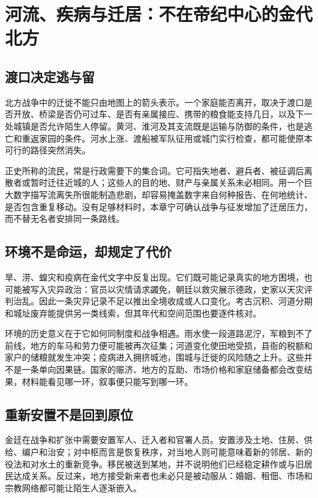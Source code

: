 \section{河流、疾病与迁居：不在帝纪中心的金代北方}

\subsection{渡口决定逃与留}

北方战争中的迁徙不能只由地图上的箭头表示。一个家庭能否离开，取决于渡口是否开放、桥梁是否仍可过车、是否有亲属接应、携带的粮食能支持几日，以及下一处城镇是否允许陌生人停留。黄河、淮河及其支流既是运输与防御的条件，也是逃亡和重返家园的条件。河水上涨、渡船被军队征用或城门实行检查，都可能使原本可行的路径突然消失。

正史所称的流民，常是行政需要下的集合词。它可指失地者、避兵者、被征调后离散者或暂时迁往近城的人；这些人的目的地、财产与亲属关系未必相同。用一个巨大数字描写流离失所很能制造悲剧，却容易掩盖数字来自何种报告、在何地统计、是否包含重复移动。没有足够材料时，本章宁可确认战争与征发增加了迁居压力，而不替无名者安排同一条路线。

\subsection{环境不是命运，却规定了代价}

旱、涝、蝗灾和疫病在金代文字中反复出现。它们既可能记录真实的地方困境，也可能被写入灾异政治：官员以灾情请求蠲免，朝廷以救灾展示德政，史家以天灾评判治乱。因此一条灾异记录不足以推出全境收成或人口变化。考古沉积、河道分期和城址废弃能提供另一类线索，但其年代和空间范围也要逐件核对。

环境的历史意义在于它如何同制度和战争相遇。雨水使一段道路泥泞，军粮到不了前线，地方的车马和劳力便可能被再次征集；河道变化使田地受损，县衙的税额和家户的储粮就发生冲突；疫病进入拥挤城池，围城与迁徙的风险随之上升。这些并不是一条单向因果链。国家的赈济、地方的互助、市场价格和家庭储备都会改变结果，材料能看见哪一环，叙事便只能写到哪一环。

\subsection{重新安置不是回到原位}

金廷在战争和扩张中需要安置军人、迁入者和官署人员。安置涉及土地、住房、供给、编户和治安；对中枢而言是恢复秩序，对当地人则可能意味着新的邻居、新的役法和对水土的重新竞争。移民被送到某地，并不说明他们已经稳定耕作或与旧居民达成关系。反过来，地方接受新来者也未必只是被动服从：婚姻、租佃、市场和宗教网络都可能让陌生人逐渐嵌入。

